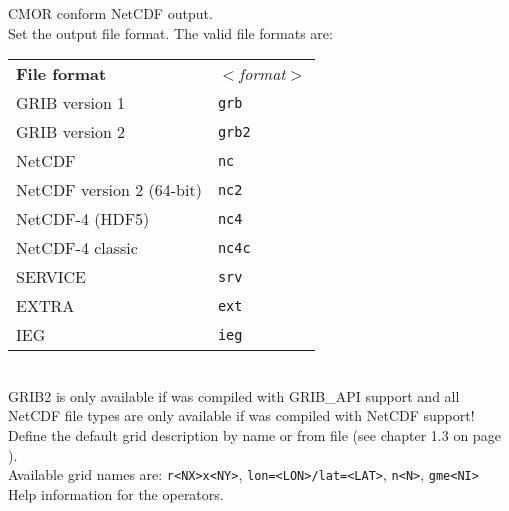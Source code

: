 \begin{tabbing}
         \> CMOR conform NetCDF output. \\
         \> Set the output file format. The valid file formats are: \\
         \> \parbox[r]{3in}{
              \vspace*{1mm}
              \hspace*{0cm}\begin{tabular}{|l|l|}
              \hline
              \rowcolor{pcolor2}
              {\bf File format}          & \sl $<$format$>$ \\
               GRIB version 1            & {\tt grb}  \\
               GRIB version 2            & {\tt grb2} \\
               NetCDF                    & {\tt nc}   \\
               NetCDF version 2 (64-bit) & {\tt nc2}  \\
               NetCDF-4 (HDF5)           & {\tt nc4}  \\
               NetCDF-4 classic          & {\tt nc4c} \\
               SERVICE                   & {\tt srv}  \\
               EXTRA                     & {\tt ext}  \\
               IEG                       & {\tt ieg}  \\
              \hline
              \end{tabular}
              \vspace*{1mm}
            } \\
         \> GRIB2 is only available if {\CDO} was compiled with GRIB\_API support and all \\
         \> NetCDF file types are only available if {\CDO} was compiled with NetCDF support! \\
         \> Define the default grid description by name or from file (see chapter 1.3 on page \pageref{GRID_DESCRIPTION}). \\
         \> Available grid names are: {\tt r<NX>x<NY>}, {\tt lon=<LON>/lat=<LAT>}, {\tt n<N>}, {\tt gme<NI>} \\
         \> Help information for the operators. \\

\end{tabbing}
